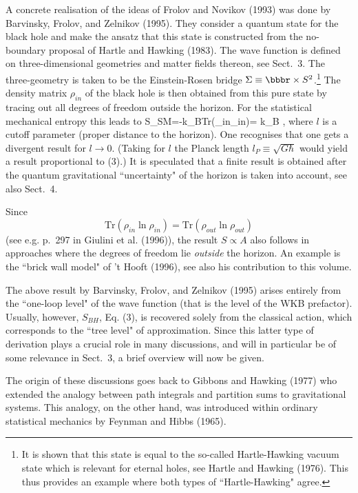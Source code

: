A concrete realisation of the ideas of Frolov and Novikov (1993)
was done by Barvinsky, Frolov, and Zelnikov (1995).
They consider a quantum state for the black hole and make the ansatz
that this state is constructed from the no-boundary proposal
of Hartle and Hawking (1983). The wave function is defined
on three-dimensional geometries and matter fields thereon, see
Sect.~3. The three-geometry is taken to be the Einstein-Rosen
bridge $\Sigma\equiv\bbbr\times S^2$.\footnote{It
 is shown that this state
is equal to the so-called Hartle-Hawking vacuum state which is
relevant for eternal holes, see Hartle and Hawking (1976). 
This thus provides an example where both types of ``Hartle-Hawking"
agree.} The density matrix $\rho_{in}$ of the black hole is then
obtained from this pure state by tracing out all degrees of freedom
outside the horizon. For the statistical mechanical entropy
this leads to
\be S_{SM}=-k_B\mbox{Tr}\left(\rho_{in}\ln\rho_{in}\right)=
     k_B \enspace , \ee
where $l$ is a cutoff parameter (proper distance to the horizon).
One recognises that one gets a divergent result for $l\to 0$.
(Taking for $l$ the Planck length $l_P\equiv\sqrt{G\hbar}$
would yield a result proportional to (3).)
It is speculated that a finite result is obtained after the
quantum gravitational ``uncertainty" of the horizon is taken
into account, see also Sect.~4.

Since 
\[ \mbox{Tr}\left(\rho_{in}\ln\rho_{in}\right)=
    \mbox{Tr}\left(\rho_{out}\ln\rho_{out}\right) \]
(see e.g. p.~297 in Giulini et al. (1996)), the result $S\propto A$
also follows in approaches where the degrees of freedom
lie {\em outside} the horizon. An example is the ``brick wall model"
of 't Hooft (1996), see also his contribution to this volume.

The above result by Barvinsky, Frolov, and Zelnikov (1995)
arises entirely from the ``one-loop level" of the wave function
(that is the level of the WKB prefactor). Usually, however, 
$S_{BH}$, Eq. (3), is recovered solely from the classical
action, which corresponds to the ``tree level" of approximation.
Since this latter type of derivation plays a crucial role in many
discussions, and will in particular be of some relevance in
Sect.~3, a brief overview will now be given.

The origin of these discussions goes back to Gibbons and Hawking
(1977) who extended the analogy between path integrals and
partition sums to gravitational systems. This analogy, on the
other hand, was introduced within ordinary statistical mechanics
by Feynman and Hibbs (1965). 


